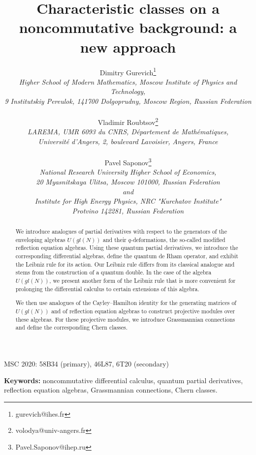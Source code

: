 \documentclass[11pt]{article}
\numberwithin{equation}{section}
\theoremstyle{plain}
\theoremstyle{definition}
\begin{document}
\title{Characteristic classes on a noncommutative background: a new approach}

\author{\rule{0pt}{7mm} Dimitry Gurevich\thanks{gurevich@ihes.fr}\\
	{\small\it Higher School of Modern Mathematics, Moscow Institute of Physics and Technology,}\\
	{\small\it 9 Institutskiy Pereulok, 141700 Dolgoprudny, Moscow Region, Russian Federation}\\
	\rule{0pt}{7mm} Vladimir Roubtsov\thanks{volodya@univ-angers.fr}\\
	{\small\it 	LAREMA, UMR 6093 du CNRS, D\'epartement de  Math\'ematiques,}\\
	{\small\it Universit\'e d'Angers, 2, boulevard Lavoisier, Angers, France}\\
	\rule{0pt}{7mm} Pavel Saponov\thanks{Pavel.Saponov@ihep.ru}\\
	{\small\it 	National Research University Higher School of Economics,}\\
	{\small\it 20 Myasnitskaya Ulitsa, Moscow 101000, Russian Federation}\\
	{\small\it and}\\
	{\small\it Institute for High Energy Physics, NRC "Kurchatov Institute"}\\
	{\small \it Protvino 142281, Russian Federation}}

\maketitle

\noindent
MSC 2020: 58B34 (primary), 46L87, 6T20 (secondary)

\smallskip

\noindent
{\bf Keywords:} noncommutative differential calculus, quantum partial derivatives, reflection equation algebras, 
Grassmannian connections, Chern classes.

\bigskip

\begin{abstract}
We introduce analogues of partial derivatives with respect to the generators of the enveloping algebras $U(gl(N))$ and their
$q$-deformations, the so-called modified reflection equation algebras. Using these quantum partial derivatives, we introduce
the corresponding differential algebras, define the quantum de Rham operator, and exhibit the Leibniz rule for its action. Our
Leibniz rule differs from its classical analogue and stems from the construction of a quantum double. In the case of the
algebra $U(gl(N))$, we present another form of the Leibniz rule that is more convenient for prolonging the differential calculus
to certain extensions of this algebra.

We then use analogues of the Cayley--Hamilton identity for the generating matrices of $U(gl(N))$ and of reflection equation algebras
to construct projective modules over these algebras. For these projective modules, we introduce Grassmannian connections and
define the corresponding Chern classes.
\end{abstract}
\end{document}
